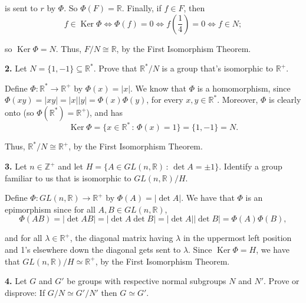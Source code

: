 \documentclass[10pt,]{book}
\theoremstyle{plain}
\theoremstyle{definition}
\theoremstyle{definition}
\theoremstyle{definition}
\theoremstyle{definition}
\numberwithin{equation}{section}
\def\Z{\mathbb{Z}}
\def\R{\mathbb{R}}
\DeclareMathOperator{\Ker}{Ker}
\begin{document}
      is sent to \(r\) by \(\Phi\). So \(\Phi(F)=\R\). Finally, if
      \(f\in F\), then
\begin{equation*}

        f\in \Ker \Phi \Leftrightarrow \Phi(f)=0 \Leftrightarrow
        f\left(\frac{1}{4}\right)=0 \Leftrightarrow f\in N;
      
\end{equation*}

      so \(\Ker
      \Phi=N\). Thus, \(F/N \cong \R\), by the First Isomorphism Theorem.
\par\smallskip
\noindent\textbf{2.}\quad{}
        Let \(N=\{1,-1\}\subseteq \R^*\). Prove that \(\R^*/N\) is
        a group that's isomorphic to
        \(\R^+\).
\par\smallskip

      Define \(\Phi: \R^* \rightarrow \R^+\) by
      \(\Phi(x)=|x|\). We know that \(\Phi\) is a homomorphism, since
      \(\Phi(xy)=|xy|=|x||y|=\Phi(x)\Phi(y)\), for every \(x,y\in \R^*\).
      Moreover, \(\Phi\) is clearly onto (so \(\Phi(\R^*)=\R^+\)), and
      has
\begin{equation*}

        \Ker \Phi=\{x\in \R^*\,:\,\Phi(x)=1\}=\{1,-1\}=N.
      
\end{equation*}

\par

      Thus,
      \(\R^*/N \cong \R^+\), by the First Isomorphism Theorem.
\par\smallskip
\noindent\textbf{3.}\quad{}
        Let \(n\in \Z^+\) and let \(H=\{A\in GL(n,\R)\,:\, \det A =\pm
        1\}\). Identify a group familiar to us that is isomorphic to
        \(GL(n,\R)/H\).
\par\smallskip

      Define \(\Phi:GL(n,\R)\to \R^+\) by
      \(\Phi(A)=|\det A|\). We have that \(\Phi\) is an epimorphism since for
      all \(A,B\in GL(n,\R)\),
\begin{equation*}

        \Phi(AB)=|\det AB|=|\det A \det B|=|\det
        A||\det B|=\Phi(A)\Phi(B),
      
\end{equation*}

      and for all \(\lambda \in \R^+\), the
      diagonal matrix having \(\lambda\) in the uppermost left position and
      1's elsewhere down the diagonal gets sent to \(\lambda\). Since \(\Ker
      \Phi=H\), we have that \(GL(n,\R)/H \simeq \R^+\), by the First
      Isomorphism Theorem.
\par\smallskip
\noindent\textbf{4.}\quad{}
        Let \(G\) and \(G'\) be groups with respective normal subgroups
        \(N\) and \(N'\). Prove or disprove: If \(G/N\simeq G'/N'\) then \(G\simeq
        G'\).
\par\smallskip
\end{document}
